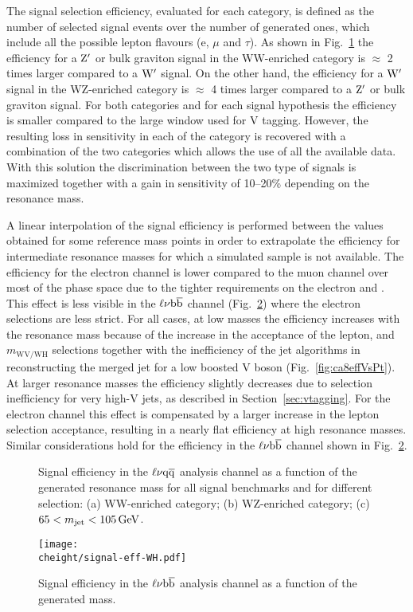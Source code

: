 The signal selection efficiency, evaluated for each category, is defined as the number of selected signal events over the number of generated ones, which include all the possible lepton flavours (e, $\mu$ and $\tau$).
As shown in Fig.~\ref{fig:effWV-13TeV} the efficiency for a $\mathrm{Z}^\prime$ or bulk graviton signal in the WW-enriched category is $\approx$ 2 times larger compared to a $\mathrm{W}^\prime$ signal. On the other hand, the efficiency for a $\mathrm{W}^\prime$ signal in the WZ-enriched category is $\approx$ 4 times larger compared to a $\mathrm{Z}^\prime$ or bulk graviton signal. For both categories and for each signal hypothesis the efficiency is smaller compared to the large \mJ window used for V tagging. However, the resulting loss in sensitivity in each of the category is recovered with a combination of the two \mJ categories which allows the use of all the available data. With this solution the discrimination between the two type of signals is maximized together with a gain in sensitivity of 10--20\% depending on the resonance mass.

A linear interpolation of the signal efficiency is performed between the values obtained for some reference mass points in order to extrapolate the efficiency for intermediate resonance masses for which a simulated sample is not available.
The efficiency for the electron channel is lower compared to the muon channel over most of the phase space due to the tighter requirements on the electron \pt and \ETmiss. This effect is less visible in the $\ell\nu{\mathrm{b}\overline{\mathrm{b}}}$ channel (Fig.~\ref{fig:effWH-8TeV}) where the electron selections are less strict. For all cases, at low masses the efficiency increases with the resonance mass because of the increase in the acceptance of the lepton, \ETmiss and $m_\mathrm{WV/WH}$ selections together with the inefficiency of the jet algorithms in reconstructing the merged jet for a low boosted V boson (Fig.~\ref{fig:ca8effVsPt}). At larger resonance masses the efficiency slightly decreases due to \nsubj selection inefficiency for very high-\pt V jets, as described in Section~\ref{sec:vtagging}.
For the electron channel this effect is compensated by a larger increase in the lepton selection acceptance, resulting in a nearly flat efficiency at high resonance masses.
Similar considerations hold for the efficiency in the $\ell\nu{\mathrm{b}\overline{\mathrm{b}}}$ channel shown in Fig.~\ref{fig:effWH-8TeV}.

\begin{figure}[!htb]
\centering
{}
\caption{Signal efficiency in the $\ell\nu\mathrm{q}\overline{\mathrm{q}}$ analysis channel as a function of the generated resonance mass for all signal benchmarks and for different \mJ selection: (a) WW-enriched category; (b) WZ-enriched category; (c) $65 < m_{\text{jet}} < 105\,\text{Ge\hspace{-.08em}V}$.}
\label{fig:effWV-13TeV}
\end{figure}

\begin{figure}[!htb]
\centering
\texttt{[image: \\cheight/signal-eff-WH.pdf]}
\caption{Signal efficiency in the $\ell\nu{\mathrm{b}\overline{\mathrm{b}}}$ analysis channel as a function of the generated \Wpr mass.}
\label{fig:effWH-8TeV}
\end{figure}